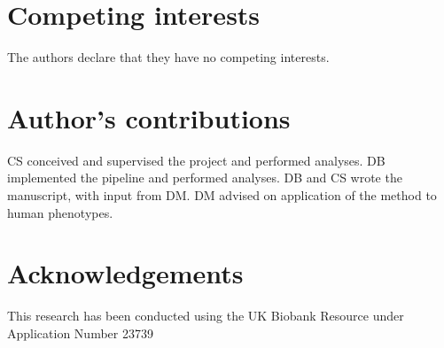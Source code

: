 \documentclass[doublespacing]{bmcart}
\begin{document}
\begin{backmatter}

\section*{Competing interests}
  The authors declare that they have no competing interests.

\section*{Author's contributions}
    CS conceived and supervised the project and performed analyses. DB implemented the pipeline and performed analyses. DB and CS wrote the manuscript, with input from DM. DM advised on application of the method to human phenotypes.

\section*{Acknowledgements}
  This research has been conducted using the UK Biobank Resource under Application Number 23739




\end{backmatter}
\end{document}
